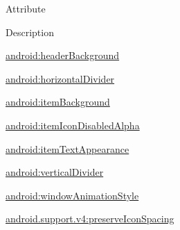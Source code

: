 Attribute

Description 

{\ttfamily \hyperlink{classandroid_1_1support_1_1v4_1_1R_1_1styleable_a971cdc4ef5fe743adb7025a13b9f3da6}{android\+:header\+Background}}

{\ttfamily \hyperlink{classandroid_1_1support_1_1v4_1_1R_1_1styleable_a626e514babb4d9c7bbca39cdd99c10bf}{android\+:horizontal\+Divider}}

{\ttfamily \hyperlink{classandroid_1_1support_1_1v4_1_1R_1_1styleable_adda46f208eef1247d481e4c8ecc3c039}{android\+:item\+Background}}

{\ttfamily \hyperlink{classandroid_1_1support_1_1v4_1_1R_1_1styleable_aa9bab0281cd32b9892b27ae9cf5ee6e6}{android\+:item\+Icon\+Disabled\+Alpha}}

{\ttfamily \hyperlink{classandroid_1_1support_1_1v4_1_1R_1_1styleable_a421fdc72dee45bf4d8a3528c310da6f7}{android\+:item\+Text\+Appearance}}

{\ttfamily \hyperlink{classandroid_1_1support_1_1v4_1_1R_1_1styleable_af14763212ce7ca49cc48e32a6a0f5cd2}{android\+:vertical\+Divider}}

{\ttfamily \hyperlink{classandroid_1_1support_1_1v4_1_1R_1_1styleable_a69e7a03d136e8951fa5421ee2396b18b}{android\+:window\+Animation\+Style}}

{\ttfamily \hyperlink{classandroid_1_1support_1_1v4_1_1R_1_1styleable_a7d9ee3b9e735dd16f51e9c76f6dc4fc5}{android.\+support.\+v4\+:preserve\+Icon\+Spacing}}

